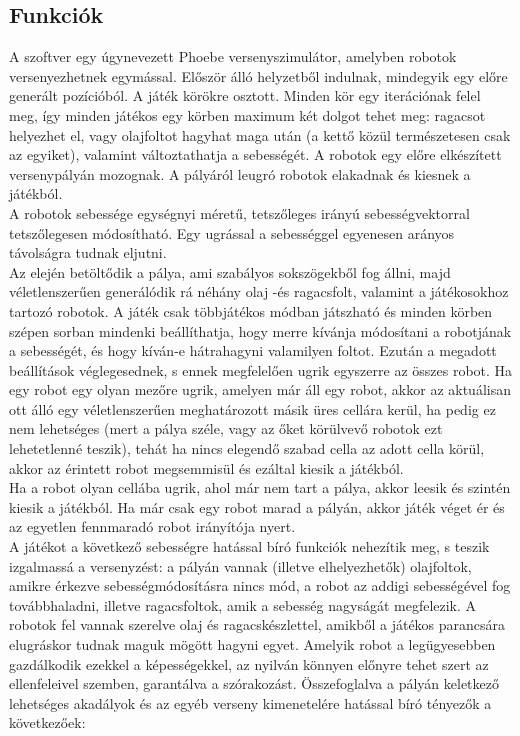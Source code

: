 \subsection{Funkciók}

A szoftver egy úgynevezett Phoebe versenyszimulátor, amelyben robotok versenyezhetnek egymással. Először álló helyzetből indulnak, mindegyik egy előre generált pozícióból. A játék körökre osztott. Minden kör egy iterációnak felel meg, így minden játékos egy körben maximum két dolgot tehet meg: ragacsot helyezhet el, vagy olajfoltot hagyhat maga után (a kettő közül természetesen csak az egyiket), valamint változtathatja a sebességét. A robotok egy előre elkészített versenypályán mozognak. A pályáról leugró robotok elakadnak és kiesnek a játékból.\\

A robotok sebessége egységnyi méretű, tetszőleges irányú sebességvektorral tetszőlegesen módosítható. Egy ugrással a sebességgel egyenesen arányos távolságra tudnak eljutni.\\

Az elején betöltődik a pálya, ami szabályos sokszögekből fog állni, majd véletlenszerűen generálódik rá néhány olaj -és ragacsfolt, valamint a játékosokhoz tartozó robotok. A játék csak többjátékos módban játszható és minden körben szépen sorban mindenki beállíthatja, hogy merre kívánja módosítani a robotjának a sebességét, és hogy kíván-e hátrahagyni valamilyen foltot. Ezután a megadott beállítások véglegesednek, s ennek megfelelően ugrik egyszerre az összes robot. Ha egy robot egy olyan mezőre ugrik, amelyen már áll egy robot, akkor az aktuálisan ott álló egy véletlenszerűen meghatározott másik üres cellára kerül, ha pedig ez nem lehetséges (mert a pálya széle, vagy az őket körülvevő robotok ezt lehetetlenné teszik), tehát ha nincs elegendő szabad cella az adott cella körül, akkor az érintett robot megsemmisül és ezáltal kiesik a játékból.\\

Ha a robot olyan cellába ugrik, ahol már nem tart a pálya, akkor leesik és szintén kiesik a játékból. Ha már csak egy robot marad a pályán, akkor játék véget ér és az egyetlen fennmaradó robot irányítója nyert.\\

A játékot a következő sebességre hatással bíró funkciók nehezítik meg, s teszik izgalmassá a versenyzést: a pályán vannak (illetve elhelyezhetők) olajfoltok, amikre érkezve sebességmódosításra nincs mód, a robot az addigi sebességével fog továbbhaladni, illetve ragacsfoltok, amik a sebesség nagyságát megfelezik. A robotok fel vannak szerelve olaj és ragacskészlettel, amikből a játékos parancsára elugráskor tudnak maguk mögött hagyni egyet. Amelyik robot a legügyesebben gazdálkodik ezekkel a képességekkel, az nyilván könnyen előnyre tehet szert az ellenfeleivel szemben, garantálva a szórakozást. Összefoglalva a pályán keletkező lehetséges akadályok és az egyéb verseny kimenetelére hatással bíró tényezők a következőek:\\

